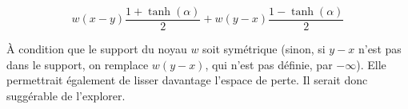 \vspace{-0.6mm}
$$w(x-y)\frac{1+\tanh{(\alpha)}}{2} + w(y-x)\frac{1-\tanh{(\alpha)}}{2}$$

\vspace{4.0mm}
\noindent À condition que le support du noyau $w$ soit symétrique (sinon, si $y-x$ n'est pas dans le support, on remplace $w(y-x)$, qui n'est pas définie, par $-\infty$). Elle permettrait également de lisser davantage l'espace de perte. Il serait donc suggérable de l'explorer.
